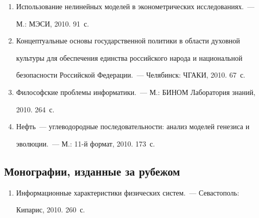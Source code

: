 \begin{enumerate}[1.]


\item




Использование нелинейных моделей в эконометрических исследованиях.~--- 


М.: МЭСИ, 2010. 91~с.


\item {}


Концептуальные основы государственной политики в области духовной 


культуры для обеспечения единства российского народа и национальной 


безопасности Российской Федерации.~--- Челябинск: ЧГАКИ, 2010.  67~с.


\item {}


Философские проблемы информатики.~--- М.: БИНОМ Лаборатория знаний, 


2010. 264~с.


\item {}


Нефть~--- углеводородные последовательности: анализ моделей генезиса и 


эволюции.~--- М.: 11-й формат, 2010. 173~с.


\end{enumerate}





\vspace{-2pt}





\subsection{Монографии, изданные за рубежом} %





\noindent


\begin{enumerate}[1.]


\item {}


Информационные характеристики физических систем.~--- Севастополь: 


Кипарис, 2010.  260~с.


\end{enumerate}





